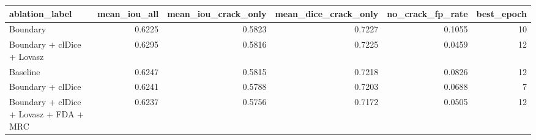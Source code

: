 \begin{tabular}{lrrrrr}
\toprule
ablation_label & mean_iou_all & mean_iou_crack_only & mean_dice_crack_only & no_crack_fp_rate & best_epoch \\
\midrule
Boundary & 0.6225 & 0.5823 & 0.7227 & 0.1055 & 10 \\
Boundary + clDice + Lovasz & 0.6295 & 0.5816 & 0.7225 & 0.0459 & 12 \\
Baseline & 0.6247 & 0.5815 & 0.7218 & 0.0826 & 12 \\
Boundary + clDice & 0.6241 & 0.5788 & 0.7203 & 0.0688 & 7 \\
Boundary + clDice + Lovasz + FDA + MRC & 0.6237 & 0.5756 & 0.7172 & 0.0505 & 12 \\
\bottomrule
\end{tabular}
